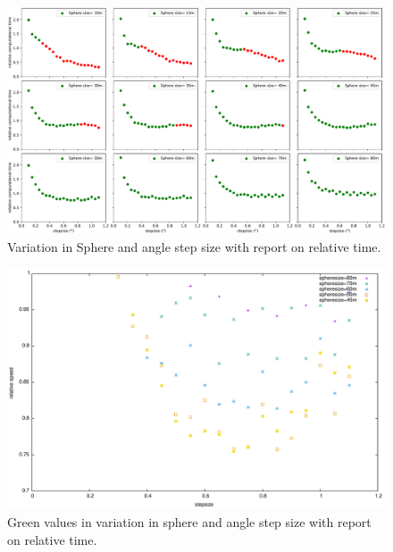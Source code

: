 \documentclass[11pt,a4paper,faculty=we,language=en,doctype=report]{cls/ugent-doc}
\begin{document}
\begin{figure}
	\includegraphics[width=\textwidth]{figures/subplotofallstepsphere.pdf}
	\caption{Variation in Sphere and angle step size with report on relative time.}
	\label{fig:SphereStepInfl}
\end{figure}

\begin{figure}
	\includegraphics[width=\textwidth]{figures/SphereAndStepFinal.pdf}
	\caption{Green values in variation in sphere and angle step size with report on relative time.}
	\label{fig:SphereStepFinal}
\end{figure}

\newpage


\end{document}
